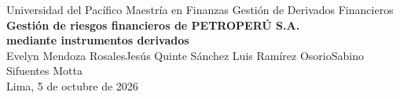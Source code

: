\documentclass[11pt]{article}
\begin{document}
\begin{center}
  {\small Universidad del Pacífico \enspace\textperiodcentered\enspace Maestría en Finanzas \enspace\textperiodcentered\enspace Gestión de Derivados Financieros}\\[4pt]
  {\Large\bfseries Gestión de riesgos financieros de PETROPERÚ S.A.\\ mediante instrumentos derivados}\\[4pt]
  {\small Evelyn Mendoza Rosales\enspace\textperiodcentered\enspace Jesús Quinte Sánchez%
    \enspace\textperiodcentered\enspace Luis Ramírez Osorio\enspace\textperiodcentered\enspace Sabino Sifuentes Motta}\\[2pt]
  {\small Lima, 5 de octubre de 2026}
\end{center}
\vspace{-0.5em}


\label{fin-cuerpo}  %
\printbibliography[heading=bibintoc,title={Referencias}]  %
\end{document}
